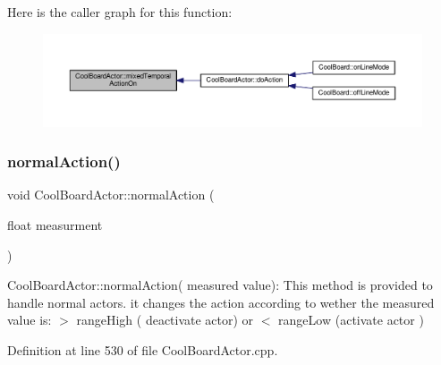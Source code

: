 Here is the caller graph for this function\+:
\nopagebreak
\begin{figure}[H]
\begin{center}
\leavevmode
\includegraphics[width=350pt]{dc/d69/class_cool_board_actor_a216aa7a0cfd1f31d0025cc91c2ecd5dd_icgraph}
\end{center}
\end{figure}
\mbox{\label{class_cool_board_actor_a81229abf5895f4d3b0355050b822b438}} 
\subsubsection{\texorpdfstring{normal\+Action()}{normalAction()}}
{\footnotesize\ttfamily void Cool\+Board\+Actor\+::normal\+Action (\begin{DoxyParamCaption}\item[{float}]{measurment }\end{DoxyParamCaption})}

Cool\+Board\+Actor\+::normal\+Action( measured value)\+: This method is provided to handle normal actors. it changes the action according to wether the measured value is\+: $>$ range\+High ( deactivate actor) or $<$ range\+Low (activate actor ) 

Definition at line 530 of file Cool\+Board\+Actor.\+cpp.


